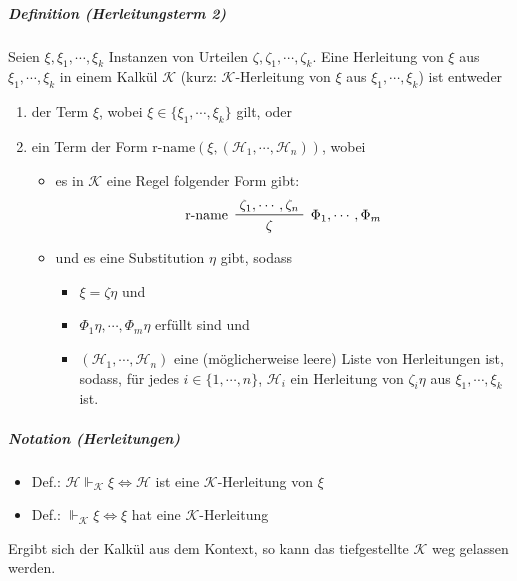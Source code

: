 \documentclass[a4paper, 11pt, accentcolor = tud3b]{tudreport}
\newcommand{\definition}[2]{\subparagraph{Definition (#1)} #2}
\newcommand{\notation}[2]{\subparagraph{Notation (#1)} #2}
\begin{document}
				    \definition{Herleitungsterm 2}{
				    	Seien $ \xi, \xi _ 1, \cdots, \xi _ k $ Instanzen von Urteilen $ \zeta, \zeta _ 1, \cdots, \zeta _ k $. Eine Herleitung von $ \xi $ aus $ \xi _ 1, \cdots, \xi _ k $ in einem Kalkül $ \mathcal{K} $ (kurz: $ \mathcal{K} $-Herleitung von $ \xi $ aus $ \xi _ 1, \cdots, \xi _ k $) ist entweder
				    	\begin{enumerate}
				    		\item der Term $ \xi $, wobei $ \xi \in \{ \xi _ 1, \cdots, \xi _ k \} $ gilt, oder
				    		\item ein Term der Form $ \text{r-name}(\xi, (\mathcal{H} _ 1, \cdots, \mathcal{H} _ n)) $, wobei
					    		\begin{itemize}
					    			\item es in $ \mathcal{K} $ eine Regel folgender Form gibt:
						    			\begin{equation*}
							    			\prftree[l, r]
								    			{ $ \Phi _ 1, \cdots, \Phi _ m $ }
								    			{ r-name }
								    			{ \zeta _ 1, \cdots, \zeta _ n }
								    			{ \zeta }
						    			\end{equation*}
						    		\item und es eine Substitution $ \eta $ gibt, sodass
							    		\begin{itemize}
							    			\item $ \xi = \zeta\eta $ und
							    			\item $ \Phi _ 1 \eta, \cdots, \Phi _ m \eta $ erfüllt sind und
							    			\item $ (\mathcal{H} _ 1, \cdots, \mathcal{H} _ n) $ eine (möglicherweise leere) Liste von Herleitungen ist, sodass, für jedes $ i \in \{ 1, \cdots, n \} $, $ \mathcal{H} _ i $ ein Herleitung von $ \zeta _ i \eta $ aus $ \xi _ 1, \cdots, \xi _ k $ ist.
							    		\end{itemize}
					    		\end{itemize}
				    	\end{enumerate}
				    }
				    
				    \notation{Herleitungen}{
					    \begin{itemize}
					    	\item Def.: $ \mathcal{H} \Vdash _ \mathcal{K} \xi \iff \mathcal{H} $ ist eine $ \mathcal{K} $-Herleitung von $ \xi $
					    	\item Def.: $ \Vdash _ \mathcal{K} \xi \iff \xi $ hat eine $ \mathcal{K} $-Herleitung
					    \end{itemize}
					    Ergibt sich der Kalkül aus dem Kontext, so kann das tiefgestellte $ \mathcal{K} $ weg gelassen werden.
				    }
				    
\end{document}
